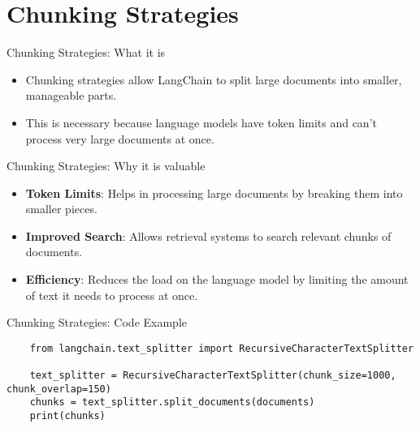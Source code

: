 \documentclass{beamer}
\begin{document}
\section{Chunking Strategies}

\begin{frame}{Chunking Strategies: What it is}
    \begin{itemize}
        \item Chunking strategies allow LangChain to split large documents into smaller, manageable parts.
        \item This is necessary because language models have token limits and can't process very large documents at once.
    \end{itemize}
\end{frame}

\begin{frame}{Chunking Strategies: Why it is valuable}
    \begin{itemize}
        \item \textbf{Token Limits}: Helps in processing large documents by breaking them into smaller pieces.
        \item \textbf{Improved Search}: Allows retrieval systems to search relevant chunks of documents.
        \item \textbf{Efficiency}: Reduces the load on the language model by limiting the amount of text it needs to process at once.
    \end{itemize}
\end{frame}

\begin{frame}[fragile]{Chunking Strategies: Code Example}
    \begin{verbatim}
    from langchain.text_splitter import RecursiveCharacterTextSplitter

    text_splitter = RecursiveCharacterTextSplitter(chunk_size=1000, chunk_overlap=150)
    chunks = text_splitter.split_documents(documents)
    print(chunks)
    \end{verbatim}
\end{frame}

\end{document}

